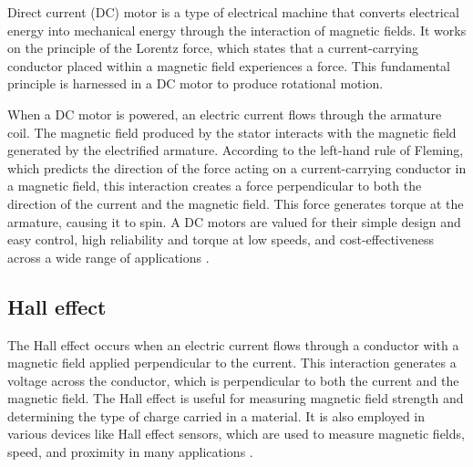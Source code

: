 Direct current (DC) motor is a type of electrical machine that converts electrical energy into mechanical energy through the interaction of magnetic fields. It works on the principle of the Lorentz force, which states that a current-carrying conductor placed within a magnetic field experiences a force. This fundamental principle is harnessed in a DC motor to produce rotational motion.

When a DC motor is powered, an electric current flows through the armature coil. The magnetic field produced by the stator interacts with the magnetic field generated by the electrified armature. According to the left-hand rule of Fleming, which predicts the direction of the force acting on a current-carrying conductor in a magnetic field, this interaction creates a force perpendicular to both the direction of the current and the magnetic field. This force generates torque at the armature, causing it to spin.
A
DC motors are valued for their simple design and easy control, high reliability and torque at low speeds, and cost-effectiveness across a wide range of applications \cite{dc-motor}.

\subsection{Hall effect}

The Hall effect occurs when an electric current flows through a conductor with a magnetic field applied perpendicular to the current. This interaction generates a voltage across the conductor, which is perpendicular to both the current and the magnetic field. The Hall effect is useful for measuring magnetic field strength and determining the type of charge carried in a material. It is also employed in various devices like Hall effect sensors, which are used to measure magnetic fields, speed, and proximity in many applications \cite{hall-effect}.
